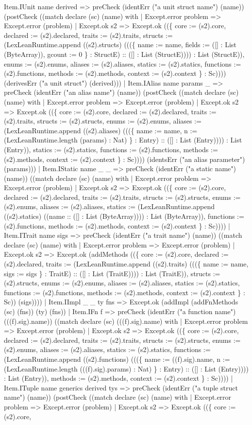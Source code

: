 \documentclass[11pt]{article}
\begin{document}
Item.IUnit name derived => preCheck (identErr ("a unit struct name") (name)) (postCheck ((match declare (sc) (name) with | Except.error problem => Except.error (problem) | Except.ok s2 => Except.ok ((\{ core := (s2).core, declared := (s2).declared, traits := (s2).traits, structs := (LexLeanRuntime.append ((s2).structs) (((\{ name := name, fields := ([] : List (ByteArray)), gcount := 0 \} : StructE) :: ([] : List (StructE)))) : List (StructE)), enums := (s2).enums, aliases := (s2).aliases, statics := (s2).statics, functions := (s2).functions, methods := (s2).methods, context := (s2).context \} : Sc)))) (derivesErr ("a unit struct") (derived))) | Item.IAlias name params \_ => preCheck (identErr ("an alias name") (name)) (postCheck ((match declare (sc) (name) with | Except.error problem => Except.error (problem) | Except.ok s2 => Except.ok ((\{ core := (s2).core, declared := (s2).declared, traits := (s2).traits, structs := (s2).structs, enums := (s2).enums, aliases := (LexLeanRuntime.append ((s2).aliases) (((\{ name := name, n := (LexLeanRuntime.length (params) : Nat) \} : Entry) :: ([] : List (Entry)))) : List (Entry)), statics := (s2).statics, functions := (s2).functions, methods := (s2).methods, context := (s2).context \} : Sc)))) (identsErr ("an alias parameter") (params))) | Item.IStatic name \_ \_ => preCheck (identErr ("a static name") (name)) ((match declare (sc) (name) with | Except.error problem => Except.error (problem) | Except.ok s2 => Except.ok ((\{ core := (s2).core, declared := (s2).declared, traits := (s2).traits, structs := (s2).structs, enums := (s2).enums, aliases := (s2).aliases, statics := (LexLeanRuntime.append ((s2).statics) ((name :: ([] : List (ByteArray)))) : List (ByteArray)), functions := (s2).functions, methods := (s2).methods, context := (s2).context \} : Sc)))) | Item.ITrait name sigs => preCheck (identErr ("a trait name") (name)) ((match declare (sc) (name) with | Except.error problem => Except.error (problem) | Except.ok s2 => Except.ok (addMethods ((\{ core := (s2).core, declared := (s2).declared, traits := (LexLeanRuntime.append ((s2).traits) (((\{ name := name, sigs := sigs \} : TraitE) :: ([] : List (TraitE)))) : List (TraitE)), structs := (s2).structs, enums := (s2).enums, aliases := (s2).aliases, statics := (s2).statics, functions := (s2).functions, methods := (s2).methods, context := (s2).context \} : Sc)) (sigs)))) | Item.IImpl \_ \_ ty fns => Except.ok (addImpl (addFnMethods (sc) (fns)) (ty) (fns)) | Item.IFn f => preCheck (identErr ("a function name") (((f).sig).name)) ((match declare (sc) (((f).sig).name) with | Except.error problem => Except.error (problem) | Except.ok s2 => Except.ok ((\{ core := (s2).core, declared := (s2).declared, traits := (s2).traits, structs := (s2).structs, enums := (s2).enums, aliases := (s2).aliases, statics := (s2).statics, functions := (LexLeanRuntime.append ((s2).functions) (((\{ name := ((f).sig).name, n := (LexLeanRuntime.length (((f).sig).params) : Nat) \} : Entry) :: ([] : List (Entry)))) : List (Entry)), methods := (s2).methods, context := (s2).context \} : Sc)))) | Item.ITuple name generics derived tys => preCheck (identErr ("a tuple struct name") (name)) (postCheck ((match declare (sc) (name) with | Except.error problem => Except.error (problem) | Except.ok s2 => Except.ok ((\{ core := (s2).core, 
\end{document}
